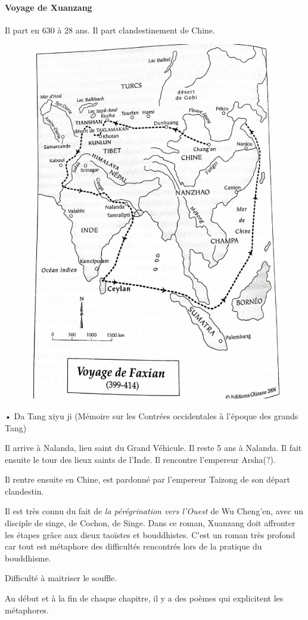 \paragraph{Voyage de Xuanzang}
 Il part en 630 à 28 ans. Il part clandestinement de Chine.
 

\begin{figure}[!h]
    \centering
    \includegraphics[width=.4\textwidth]{ConfucianismeTaoismeBouddhismeChinois/Images/XuanzangInde.jpg}

    \label{fig:enter-label}
\end{figure}
•	Da Tang xiyu ji (Mémoire sur les Contrées occidentales à l’époque des grands Tang)

Il arrive à Nalanda, lieu saint du Grand Véhicule.
Il reste 5 ans à Nalanda. Il fait ensuite le tour des lieux saints de l'Inde. Il rencontre l'empereur Arsha(?).

Il rentre ensuite en Chine, est pardonné par l'empereur Taizong de son départ clandestin. 

\begin{Prop}
    Il est très connu du fait de \textit{la pérégrination vers l'Ouest } de Wu Cheng'en, avec un disciple de singe, de Cochon, de Singe. Dans ce roman, Xuanzang doit affronter les étapes grâce aux dieux taoïstes et bouddhistes. C'est un roman très profond car tout est métaphore des difficultés rencontrés lors de la pratique du bouddhisme.
\end{Prop}

\begin{Ex}
    Difficulté à maitriser le souffle.
\end{Ex}

Au début et à la fin de chaque chapitre, il y a des poèmes qui explicitent les métaphores.


